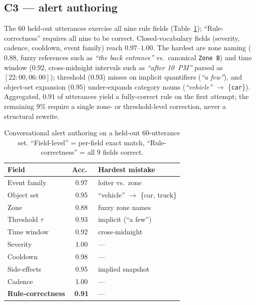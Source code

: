 ﻿\documentclass[conference]{IEEEtran}
\theoremstyle{definition}
\begin{document}
\subsection{C3 — alert authoring}
The 60 held-out utterances exercise all nine rule fields (Table~\ref{tab:alert_authoring}); ``Rule-correctness'' requires all nine to be correct. Closed-vocabulary fields (severity, cadence, cooldown, event family) reach $0.97$--$1.00$. The hardest are zone naming ($0.88$, fuzzy references such as \textit{``the back entrance''} vs.\ canonical \texttt{Zone~B}) and time window ($0.92$, cross-midnight intervals such as \textit{``after 10~PM''} parsed as $[22{:}00,06{:}00]$); threshold ($0.93$) misses on implicit quantifiers (\textit{``a few''}), and object-set expansion ($0.95$) under-expands category nouns (\textit{``vehicle''} $\to$ \{\texttt{car}\}). Aggregated, $0.91$ of utterances yield a fully-correct rule on the first attempt; the remaining $9\%$ require a single zone- or threshold-level correction, never a structural rewrite.
\begin{table}[!t]
\caption{Conversational alert authoring on a held-out 60-utterance set. ``Field-level'' = per-field exact match, ``Rule-correctness'' = all 9 fields correct.}
\label{tab:alert_authoring}
\centering
\scriptsize
\setlength{\tabcolsep}{3pt}
\begin{tabular*}{\columnwidth}{@{\extracolsep{\fill}}lcl@{}}
\toprule
Field & Acc.\ & Hardest mistake \\
\midrule
Event family       & 0.97 & loiter vs.\ zone \\
Object set         & 0.95 & ``vehicle'' $\to$ \{car, truck\} \\
Zone               & 0.88 & fuzzy zone names \\
Threshold $\tau$   & 0.93 & implicit (``a few'') \\
Time window        & 0.92 & cross-midnight \\
Severity           & 1.00 & --- \\
Cooldown           & 0.98 & --- \\
Side-effects       & 0.95 & implied snapshot \\
Cadence            & 1.00 & --- \\
\midrule
\textbf{Rule-correctness} & \textbf{0.91} & --- \\
\bottomrule
\end{tabular*}
\end{table}
\end{document}
